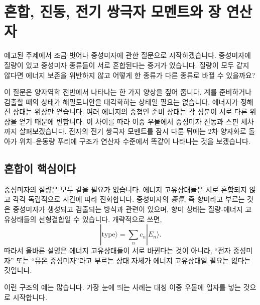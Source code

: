 \chapter{혼합, 진동, 전기 쌍극자 모멘트와 장 연산자}

예고된 주제에서 조금 벗어나 중성미자에 관한 질문으로 시작하겠습니다. 중성미자에 질량이 있고 중성미자 종류들이 서로 혼합된다는 증거가 있습니다. 질량이 모두 같지 않다면 에너지 보존을 위반하지 않고 어떻게 한 종류가 다른 종류로 바뀔 수 있을까요?

이 질문은 양자역학 전반에서 나타나는 한 가지 양상을 짚어 줍니다. 계를 준비하거나 검출할 때의 상태가 해밀토니안을 대각화하는 상태일 필요는 없습니다. 에너지가 정해진 상태는 위상만 얻습니다. 여러 에너지의 중첩인 준비 상태는 각 성분이 서로 다른 위상을 얻기 때문에 변합니다. 이 차이를 따라 이중 우물에서 중성미자 진동과 스핀 세차까지 살펴보겠습니다. 전자의 전기 쌍극자 모멘트를 잠시 다룬 뒤에는 2차 양자화로 돌아가 위치--운동량 푸리에 구조가 연산자 수준에서 똑같이 나타나는 것을 보겠습니다.

\section{혼합이 핵심이다}

중성미자의 질량은 모두 같을 필요가 없습니다. 에너지 고유상태들은 서로 혼합되지 않고 각각 독립적으로 시간에 따라 진화합니다. 중성미자의 \emph{종류}, 즉 향미라고 부르는 것은 중성미자가 생성되고 검출되는 방식과 관련이 있으며, 향미 상태는 질량-에너지 고유상태들의 선형결합일 수 있습니다. 개략적으로 쓰면,
\begin{equation}
|\text{type}\rangle = \sum_n c_n |E_n\rangle .
\end{equation}
따라서 올바른 설명은 에너지 고유상태들이 서로 바뀐다는 것이 아니라, ``전자 중성미자'' 또는 ``뮤온 중성미자''라고 부르는 상태 자체가 에너지 고유상태일 필요는 없다는 것입니다.

\begin{classroomqa}
\end{classroomqa}

이런 구조의 예는 많습니다. 가장 눈에 띄는 사례는 대칭 이중 우물에 입자를 넣는 것으로 시작합니다.

